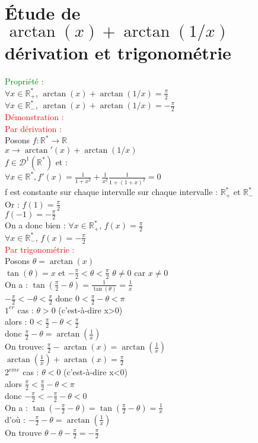 \documentclass{article}
\begin{document}
	\section{\'Etude de $\arctan(x)+ \arctan (1/x)$ dérivation et trigonométrie}
	\textcolor{green}{Propriété :} \\
	$\forall x \in \mathbb{R}^*_+$, $\arctan(x)+ \arctan (1/x)=\frac{\pi}{2}$ \\
	$\forall x \in \mathbb{R}^*_-$, $\arctan(x)+ \arctan (1/x)=-\frac{\pi}{2}$ \\
	\textcolor{red}{Démonstration :} \\
	\textcolor{red}{Par dérivation :} \\
	Posons $f : \mathbb{R}^* \rightarrow \mathbb{R}$ \\
	\indent $x \rightarrow \arctan'(x) + \arctan(1/x)$ \\
	$f \in \mathcal{D}^1(\mathbb{R}^*)$ et : \\
	$\forall x \in \mathbb{R}^*, f'(x)=\frac{1}{1+x^2}+ \frac{1}{x^2} \frac{1}{1+(1+x)^2}=0$ \\
	f est constante sur chaque intervalle sur chaque intervalle : $\mathbb{R}^*_+$ et $\mathbb{R}^*_-$ \\
	Or : $f(1)= \frac{\pi}{2}$ \\
	$f(-1)=-\frac{\pi}{2}$ \\
	On a donc bien :
		$\forall x \in \mathbb{R}^*_+$, $f(x)=\frac{\pi}{2}$ \\
	$\forall x \in \mathbb{R}^*_-$, $f(x)=-\frac{\pi}{2}$  \\
	\textcolor{red}{Par trigonométrie :} \\
	Posons $ \theta = \arctan(x)$ \\
	$\tan(\theta) = x$ et $-\frac{\pi}{2}<\theta<\frac{\pi}{2}$
	$\theta \neq 0$ car $x \neq 0$ \\
	On a :
	$\tan(\frac{\pi}{2}- \theta ) = \frac{1}{\tan(\theta)}=\frac{1}{x}$ \\
	$- \frac{\pi}{2}<-\theta<\frac{\pi}{2}$ donc $0< \frac{\pi}{2}-\theta < \pi$ \\
	$1^{er}$ cas : $\theta > 0$ (c'est-à-dire x>0) \\
	\indent alors : $0< \frac{\pi}{2}-\theta< \frac{\pi}{2}$ \\
	donc $ \frac{\pi}{2}-\theta = \arctan(\frac{1}{x})$ \\
	On trouve: $ \frac{\pi}{2}-\arctan(x)= \arctan(\frac{1}{x})$ \\
	\indent $\arctan(\frac{1}{x}) +\arctan(x)=\frac{\pi}{2}$ \\
	$2^{eme}$ cas : $\theta < 0$ (c'est-à-dire x<0) \\
	alors $ \frac{\pi}{2}<\frac{\pi}{2}- \theta < \pi $ \\
	donc $- \frac{\pi}{2}<-\frac{\pi}{2}-\theta<0$ \\
	On a : $\tan(-\frac{\pi}{2}-\theta)= \tan(\frac{\pi}{2}-\theta)= \frac{1}{x}$ \\
		d'où : $-\frac{\pi}{2}-\theta= \arctan(\frac{1}{x})$ \\
		On trouve $ \theta - \theta -\frac{\pi}{2}=-\frac{\pi}{2}$
\end{document}
